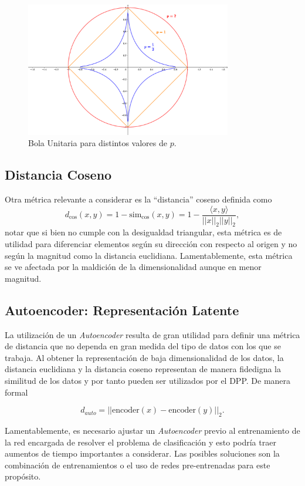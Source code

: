 \begin{figure}[ht]
    \centering
    \includegraphics[width=9cm]{img/tesis/bola_unitaria.png}
    \caption{Bola Unitaria para distintos valores de $p$.}
    \label{fig:2d_unit_balls}
\end{figure}

\subsection{Distancia Coseno}

Otra métrica relevante a considerar es la ``distancia'' coseno definida como 
\[
d_{\text{cos}}(x,y) = 1 - \text{sim}_{\text{cos}}(x,y) = 1 - \frac{\langle x,y \rangle}{||x||_2||y||_2} , 
\]
notar que si bien no cumple con la desigualdad triangular, esta métrica es de utilidad para diferenciar elementos según su dirección con respecto al origen y no según la magnitud como la distancia euclidiana. Lamentablemente, esta métrica se ve afectada por la maldición de la dimensionalidad aunque en menor magnitud. 


\subsection{Autoencoder: Representación Latente}

La utilización de un \textit{Autoencoder} resulta de gran utilidad para definir una métrica de distancia que no dependa en gran medida del tipo de datos con los que se trabaja. Al obtener la representación de baja dimensionalidad de los datos, la distancia euclidiana y la distancia coseno representan de manera fidedigna la similitud de los datos y por tanto pueden ser utilizados por el DPP. De manera formal 

\[
d_{auto} = || \text{encoder}(x) - \text{encoder}(y) ||_2 .
\]

Lamentablemente, es necesario ajustar un \textit{Autoencoder} previo al entrenamiento de la red encargada de resolver el problema de clasificación y esto podría traer aumentos de tiempo importantes a considerar. Las posibles soluciones son la combinación de entrenamientos o el uso de redes pre-entrenadas para este propósito.   

